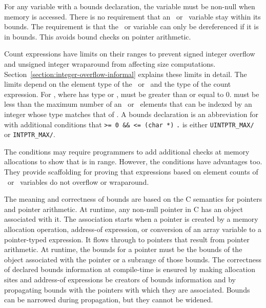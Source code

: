For any variable with a bounds declaration, the variable must be
non-null when memory is accessed.  There is no requirement that an
\arrayptr\ or \ntarrayptr\ variable stay within its bounds. The requirement 
is that the \arrayptr\ or \ntarrayptr variable can only be dereferenced if it
is in bounds. This avoids bound checks on pointer arithmetic.

Count expressions have limits on their ranges to prevent signed integer
overflow and unsigned integer wraparound from affecting size
computations. Section~\ref{section:integer-overflow-informal}
explains these limits in detail. The limits
depend on the element type of the \arrayptr\ or \ntarrayptr\ 
and the type of the count
expression. For , where 
has type \arrayptrT or \ntarrayptrT,
 must be greater than or equal to 0. \var{e1} must be less
than the maximum number of an
\arrayptrT\ or \ntarrayptrT\ elements
that can be indexed by an integer whose type matches that of .
A bounds declaration \boundsdecl{\var{x}}{\boundscount{}} is an
abbreviation for  with additional conditions that 
\texttt{>= 0 \&\& \var{e1} <= (char *)}
\texttt{.} \var{ub} is either
\texttt{UINTPTR\_MAX/} or
\texttt{INTPTR\_MAX/\sizeof{\var{T}}}. 

The conditions may require programmers to add additional checks at memory allocations
to show that \var{e1} is in range. However, the conditions have advantages too.
They provide scaffolding for proving that expressions based on
element counts of \arrayptr\ or \ntarrayptr\ variables do not overflow or wraparound.

The meaning and correctness of bounds are based on the C semantics for
pointers and pointer arithmetic. At runtime, any non-null pointer in C
has an object associated with it. The association starts when a pointer
is created by a memory allocation operation, address-of expression, or
conversion of an array variable to a pointer-typed expression. It flows
through to pointers that result from pointer arithmetic. At runtime, the
bounds for a pointer must be the bounds of the object associated with
the pointer or a subrange of those bounds. The correctness of declared
bounds information at compile-time is ensured by making allocation sites
and address-of expressions be creators of bounds information and by
propagating bounds with the pointers with which they are associated.
Bounds can be narrowed during propagation, but they cannot be widened.

